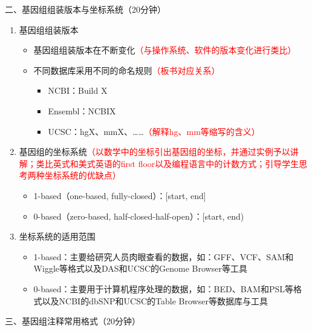 \documentclass{TIJMUjiaoanLL}
\begin{document}
\noindent
二、基因组组装版本与坐标系统（20分钟）
\begin{enumerate}
  \item 基因组组装版本
    \begin{itemize}
      \item 基因组组装版本在不断变化\textcolor{red}{（与操作系统、软件的版本变化进行类比）}
      \item 不同数据库采用不同的命名规则\textcolor{red}{（板书对应关系）}
	\begin{itemize}
	  \item NCBI：Build X
	  \item Ensembl：NCBIX
	  \item UCSC：hgX、mmX、……\textcolor{red}{（解释hg、mm等缩写的含义）}
	\end{itemize}
    \end{itemize}
  \item 基因组的坐标系统\textcolor{red}{（以数学中的坐标引出基因组的坐标，并通过实例予以讲解；类比英式和美式英语的first floor以及编程语言中的计数方式；引导学生思考两种坐标系统的优缺点）}
    \begin{itemize}
      \item 1-based（one-based, fully-closed）：[start, end]
      \item 0-based（zero-based, half-closed-half-open）：[start, end)
    \end{itemize}
  \item 坐标系统的适用范围
    \begin{itemize}
      \item 1-based：主要给研究人员肉眼查看的数据，如：GFF、VCF、SAM和Wiggle等格式以及DAS和UCSC的Genome Browser等工具
      \item 0-based：主要用于计算机程序处理的数据，如：BED、BAM和PSL等格式以及NCBI的dbSNP和UCSC的Table Browser等数据库与工具
    \end{itemize}
\end{enumerate}

\noindent
三、基因组注释常用格式（20分钟）
\end{document}
